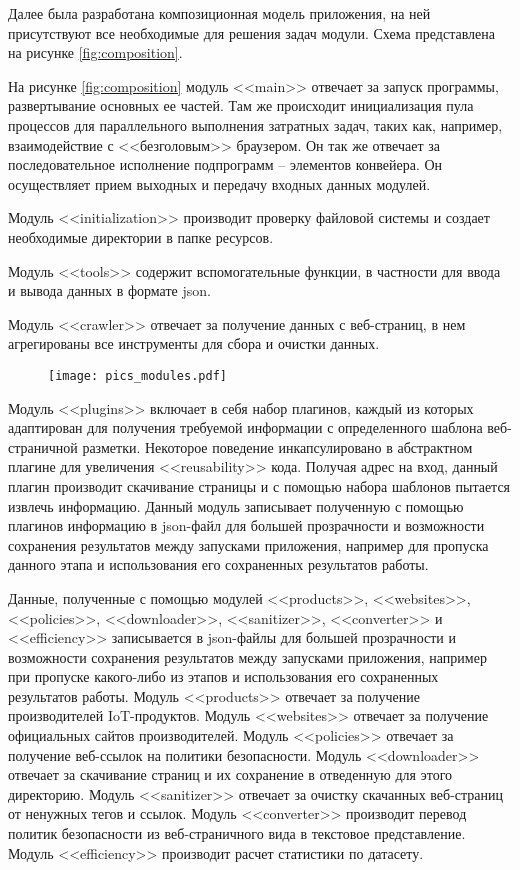 \documentclass[../main]{subfiles}
\begin{document}
Далее была разработана композиционная модель приложения, на ней присутствуют все необходимые для решения задач модули. Схема представлена на рисунке \ref{fig:composition}.

На рисунке \ref{fig:composition} модуль <<main>> отвечает за запуск программы, развертывание основных ее частей. Там же происходит инициализация пула процессов для параллельного выполнения затратных задач, таких как, например, взаимодействие с <<безголовым>> браузером. Он так же отвечает за последовательное исполнение подпрограмм -- элементов конвейера. Он осуществляет прием выходных и передачу входных данных модулей.

Модуль <<initialization>> производит проверку файловой системы и создает необходимые директории в папке ресурсов.

Модуль <<tools>> содержит вспомогательные функции, в частности для ввода и вывода данных в формате json. 

Модуль <<crawler>> отвечает за получение данных с веб-страниц, в нем агрегированы все инструменты для сбора и очистки данных. 

\begin{figure}[H]
    \centering
    {\texttt{[image: pics\_modules.pdf]}}
    \vspace{-\baselineskip}
\end{figure}

Модуль <<plugins>> включает в себя набор плагинов, каждый из которых адаптирован для получения требуемой информации с определенного шаблона веб-страничной разметки. Некоторое поведение инкапсулировано в абстрактном плагине для увеличения <<reusability>> кода. Получая адрес на вход, данный плагин производит скачивание страницы и с помощью набора шаблонов пытается извлечь информацию. Данный модуль записывает полученную с помощью плагинов информацию в json-файл для большей прозрачности и возможности сохранения результатов между запусками приложения, например для пропуска данного этапа и использования его сохраненных результатов работы. 

Данные, полученные с помощью модулей <<products>>, <<websites>>, <<policies>>, <<downloader>>, <<sanitizer>>, <<converter>> и <<efficiency>> записывается в json-файлы для большей прозрачности и возможности сохранения результатов между запусками приложения, например при пропуске какого-либо из этапов и использования его сохраненных результатов работы. Модуль <<products>> отвечает за получение производителей IoT-продуктов. Модуль <<websites>> отвечает за получение официальных сайтов производителей. Модуль <<policies>> отвечает за получение веб-ссылок на политики безопасности. Модуль <<downloader>> отвечает за скачивание страниц и их сохранение в отведенную для этого директорию. Модуль <<sanitizer>> отвечает за очистку скачанных веб-страниц от ненужных тегов и ссылок. Модуль <<converter>> производит перевод политик безопасности из веб-страничного вида в текстовое представление. Модуль <<efficiency>> производит расчет статистики по датасету.
\end{document}
